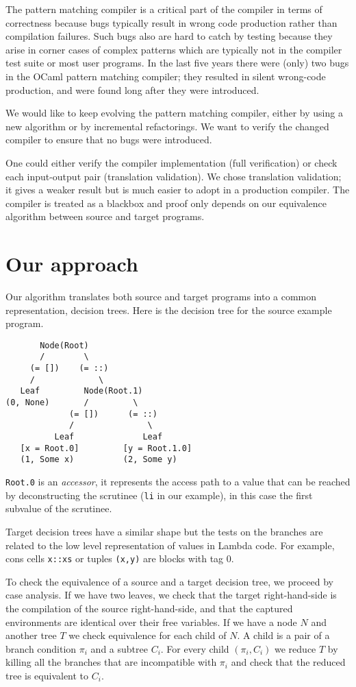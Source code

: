 \documentclass[12pt]{article}
\begin{document}
The pattern matching compiler is a critical part of the compiler
in terms of correctness because bugs typically result in wrong code
production rather than compilation failures.
Such bugs also are hard to catch by testing because they arise in
corner cases of complex patterns which are typically not in the
compiler test suite or most user programs.
In the last five years there were (only) two bugs in the OCaml pattern
matching compiler; they resulted in silent wrong-code production,
and were found long after they were introduced.

We would like to keep evolving the pattern matching compiler, either by
using a new algorithm or by incremental refactorings.
We want to verify the changed compiler to ensure that no bugs were
introduced.

One could either verify the compiler implementation
(full verification) or check each input-output pair
(translation validation). We chose translation validation; it gives
a weaker result but is much easier to adopt in a production
compiler. The compiler is treated as a blackbox and proof only depends
on our equivalence algorithm between source and target programs.

\section{Our approach}
Our algorithm translates both source and target programs into a common
representation, decision trees. Here is the decision tree for the
source example program.
\begin{verbatim}
       Node(Root)
       /        \
     (= [])    (= ::)
     /             \
   Leaf         Node(Root.1)
(0, None)       /         \
             (= [])      (= ::)
             /               \
          Leaf              Leaf
   [x = Root.0]         [y = Root.1.0]
   (1, Some x)          (2, Some y)
\end{verbatim}
\texttt{Root.0} is an \emph{accessor}, it represents the
access path to a value that can be reached by deconstructing the
scrutinee (\texttt{li} in our example), in this case the first
subvalue of the scrutinee.

Target decision trees have a similar shape but the tests on the
branches are related to the low level representation of values in
Lambda code. For example, cons cells \texttt{x::xs} or tuples
\texttt{(x,y)} are blocks with tag 0.

To check the equivalence of a source and a target decision tree,
we proceed by case analysis.
%
If we have two leaves, we check that the target right-hand-side is the
compilation of the source right-hand-side, and that the captured
environments are identical over their free variables.
%
If we have a node $N$ and another tree $T$ we check equivalence for
each child of $N$. A child is a pair of a branch condition $\pi_i$ and a
subtree $C_i$. For every child $(\pi_i, C_i)$ we reduce $T$ by killing all
the branches that are incompatible with $\pi_i$ and check that the
reduced tree is equivalent to $C_i$.
\end{document}
